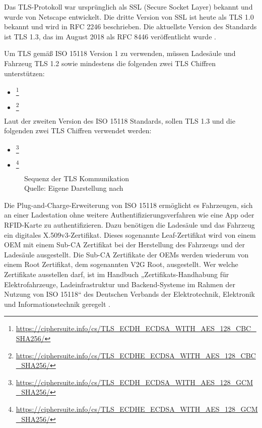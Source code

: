 Das TLS-Protokoll war ursprünglich als SSL (Secure Socket Layer) bekannt und wurde von Netscape entwickelt. Die dritte Version von SSL ist heute als TLS 1.0 bekannt und wird in RFC 2246 beschrieben. Die aktuellste Version des Standards ist TLS 1.3, das im August 2018 als RFC 8446 veröffentlicht wurde \cite[S. 376]{ipnetze}.

Um TLS gemäß ISO 15118 Version 1 zu verwenden, müssen Ladesäule und Fahrzeug TLS 1.2 sowie mindestens die folgenden zwei TLS Chiffren unterstützen:
\begin{itemize}
\item {}\footnote{\url{https://ciphersuite.info/cs/TLS_ECDH_ECDSA_WITH_AES_128_CBC_SHA256/}}
\item {}\footnote{\url{https://ciphersuite.info/cs/TLS_ECDHE_ECDSA_WITH_AES_128_CBC_SHA256/}}
\end{itemize}

Laut der zweiten Version des ISO 15118 Standards, sollen TLS 1.3 und die folgenden zwei TLS Chiffren verwendet werden:
\begin{itemize}
\item {}\footnote{\url{https://ciphersuite.info/cs/TLS_ECDH_ECDSA_WITH_AES_128_GCM_SHA256/}}
\item {}\footnote{\url{https://ciphersuite.info/cs/TLS_ECDHE_ECDSA_WITH_AES_128_GCM_SHA256/}}
\end{itemize}

\cite[]{frauenhoferIsoTLS}

\begin{figure}[H]
	\centering
	
	\caption{Sequenz der TLS Kommunikation \\ Quelle: Eigene Darstellung nach \cite{masterIso15118}}
	\label{fig:context}
\end{figure}

Die Plug-and-Charge-Erweiterung von ISO 15118 ermöglicht es Fahrzeugen, sich an einer Ladestation ohne weitere Authentifizierungsverfahren wie eine App oder RFID-Karte zu authentifizieren. Dazu benötigen die Ladesäule und das Fahrzeug ein digitales X.509v3-Zertifikat. Dieses sogenannte Leaf-Zertifikat wird von einem OEM mit einem Sub-CA Zertifikat bei der Herstellung des Fahrzeugs und der Ladesäule ausgestellt. Die Sub-CA Zertifikate der OEMs werden wiederum von einem Root Zertifikat, dem sogenannten V2G Root, ausgestellt. Wer welche Zertifikate ausstellen darf, ist im Handbuch „Zertifikats-Handhabung für Elektrofahrzeuge, Ladeinfrastruktur und Backend-Systeme im Rahmen der Nutzung von ISO 15118“ des Deutschen Verbands der Elektrotechnik, Elektronik und Informationstechnik geregelt \cite[S. 10]{pkiInfo}.

